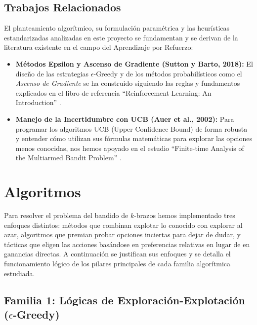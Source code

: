 \subsection{Trabajos
Relacionados}\label{trabajos-relacionados}

El planteamiento algorítmico, su formulación paramétrica y las
heurísticas estandarizadas analizadas en este proyecto se fundamentan y
se derivan de la literatura existente en el campo del Aprendizaje por
Refuerzo: 

\begin{itemize}
    \setlength\itemsep{1em}
    
    \item[\textcolor{UMUblue}\textbullet] \textbf{Métodos Epsilon y Ascenso de Gradiente (Sutton y
    Barto, 2018):} El diseño de las estrategias \(\epsilon\)-Greedy y de los
    métodos probabilísticos como el \emph{Ascenso de Gradiente} se ha
    construido siguiendo las reglas y fundamentos explicados en el libro de
    referencia ``Reinforcement Learning: An Introduction''
    \cite{sutton2018reinforcement}. 

    \item[\textcolor{UMUblue}\textbullet] \textbf{Manejo de la Incertidumbre con
    UCB (Auer et al., 2002):} Para programar los algoritmos UCB (Upper
    Confidence Bound) de forma robusta y entender cómo utilizan sus fórmulas
    matemáticas para explorar las opciones menos conocidas, nos hemos
    apoyado en el estudio ``Finite-time Analysis of the Multiarmed Bandit
    Problem'' \cite{auer2002finitetime}.
\end{itemize}

\section{Algoritmos}\label{algoritmos}

Para resolver el problema del bandido de \(k\)-brazos hemos implementado
tres enfoques distintos: métodos que combinan explotar lo conocido con
explorar al azar, algoritmos que premian probar opciones inciertas para
dejar de dudar, y tácticas que eligen las acciones basándose en
preferencias relativas en lugar de en ganancias directas. A continuación
se justifican sus enfoques y se detalla el funcionamiento lógico de los
pilares principales de cada familia algorítmica estudiada.

\subsection{\texorpdfstring{Familia 1: Lógicas de
Exploración-Explotación
(\(\epsilon\)-Greedy)}{Familia 1: Lógicas de Exploración-Explotación (\textbackslash epsilon-Greedy)}}\label{familia-1-luxf3gicas-de-exploraciuxf3n-explotaciuxf3n-epsilon-greedy}

